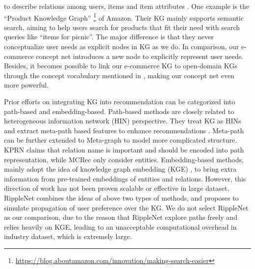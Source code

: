to describe relations among users, items and item attributes \cite{catherine2017explainable,ai2018learning}.
One example is the ``Product Knowledge Graph'' \footnote{\url{https://blog.aboutamazon.com/innovation/making-search-easier}} of Amazon. Their KG mainly supports semantic search, aiming to help users search for products that fit their need with search queries like ``items for picnic''. The major difference is that they never conceptualize user needs as explicit nodes in KG as we do.
In comparison, our e-commerce concept net introduces a new node to explicitly represent user needs. Besides, it becomes possible to link our e-commerce KG to open-domain KGs through the concept vocabulary mentioned in , making our concept net even more powerful.

Prior efforts on integrating KG into recommendation can be categorized into path-based and embedding-based.
Path-based methods are closely related to heterogeneous information network (HIN) perspective. They treat KG as HINs and extract meta-path based features to enhance recommendations \cite{zhao2017meta,gao2018recommendation}. 
Meta-path can be further extended to Meta-graph \cite{zhao2017meta} to model more complicated structure.
KPRN \cite{wang2018explainable} claims that relation name is important and should be encoded into path representation, while MCRec \cite{hu2018leveraging} only consider entities.
Embedding-based methods, mainly adopt the idea of knowledge graph embedding (KGE) \cite{wang2014knowledge,lin2015learning}, to bring extra information from pre-trained embeddings of entities and relations. However, this direction of work has not been proven scalable or effective in large dataset. 
RippleNet \cite{wang2018ripplenet} combines the ideas of above two types of methods, and proposes to simulate propagation of user preference over the KG.
We do not select RippleNet as our comparison,
due to the reason that RippleNet explore paths freely and relies heavily on KGE, leading to an unacceptable computational overhead in industry dataset, which is extremely large.


